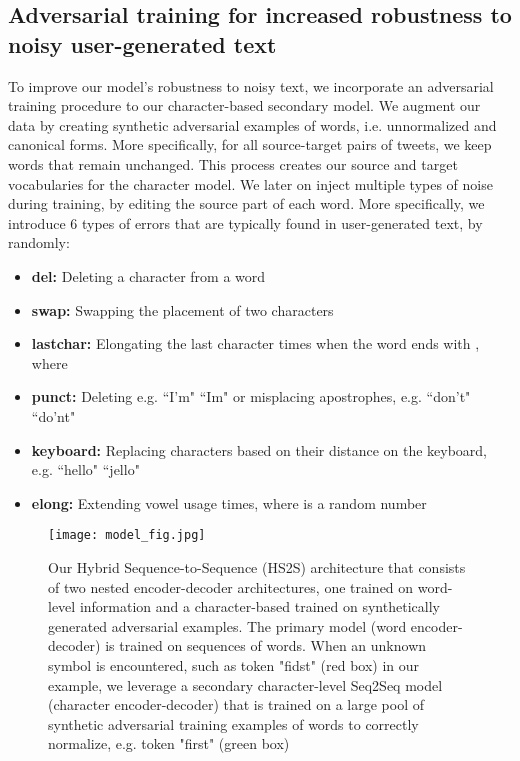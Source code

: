 \documentclass[letterpaper]{article} \usepackage{aaai19}  \usepackage{times}  \usepackage{helvet} \usepackage{courier}  \usepackage[hyphens]{url}  \usepackage{graphicx} \urlstyle{rm} \def\UrlFont{\rm}  \usepackage{graphicx}  \frenchspacing  \setlength{\pdfpagewidth}{8.5in}  \setlength{\pdfpageheight}{11in}
\begin{document}
\subsection{Adversarial training for increased robustness to noisy user-generated text}
To improve our model's robustness to noisy text, we incorporate an adversarial training procedure to our character-based secondary model. We augment our data by  creating synthetic adversarial examples of words, i.e. unnormalized and canonical forms. More specifically, for all source-target pairs of tweets, we keep words that remain unchanged. This process creates our source and target vocabularies for the character model. We later on inject multiple types of noise during training, by editing the source part of each word. More specifically, we introduce 6 types of errors that are typically found in user-generated text, by randomly:

\begin{itemize}
    \item[]\textbf{del:} Deleting a character from a word
    \item[]\textbf{swap:}  Swapping the placement of two characters 
    \item[]\textbf{lastchar:}  Elongating the last character  times when the word ends with , where  
    \item[]\textbf{punct:}  Deleting  e.g. ``I'm"  ``Im"  or misplacing apostrophes, e.g. ``don't"  ``do'nt" 
    \item[]\textbf{keyboard:}  Replacing characters based on their distance on the keyboard, e.g. ``hello"  ``jello"
    \item[]\textbf{elong:}  Extending vowel usage  times, where  is a random number
\end{itemize}

\begin{figure*}
    \centering
    \texttt{[image: model\_fig.jpg]}
    \caption{Our Hybrid Sequence-to-Sequence (HS2S) architecture that consists of two nested encoder-decoder architectures, one trained on word-level information and a character-based trained on synthetically generated adversarial examples. The primary model (word encoder-decoder) is trained on sequences of words. When an unknown symbol is encountered, such as token "fidst" (red box) in our example, we leverage a secondary character-level Seq2Seq model (character encoder-decoder) that is trained on a large pool of synthetic adversarial training examples of words to correctly normalize, e.g. token "first" (green box)}
    \label{fig:model}
\end{figure*}
\end{document}
